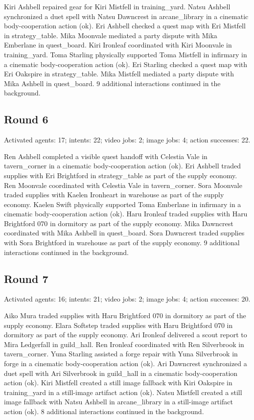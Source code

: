 \documentclass[11pt,a4paper]{article}
\begin{document}
Kiri Ashbell repaired gear for Kiri Mistfell in training\_yard. Natsu Ashbell synchronized a duet spell with Natsu Dawncrest in arcane\_library in a cinematic body-cooperation action (ok). Eri Ashbell checked a quest map with Eri Mistfell in strategy\_table. Mika Moonvale mediated a party dispute with Mika Emberlane in quest\_board. Kiri Ironleaf coordinated with Kiri Moonvale in training\_yard. Toma Starling physically supported Toma Mistfell in infirmary in a cinematic body-cooperation action (ok). Eri Starling checked a quest map with Eri Oakspire in strategy\_table. Mika Mistfell mediated a party dispute with Mika Ashbell in quest\_board. 9 additional interactions continued in the background.

\subsection{Round 6}
Activated agents: 17; intents: 22; video jobs: 2; image jobs: 4; action successes: 22.

Ren Ashbell completed a visible quest handoff with Celestia Vale in tavern\_corner in a cinematic body-cooperation action (ok). Eri Ashbell traded supplies with Eri Brightford in strategy\_table as part of the supply economy. Ren Moonvale coordinated with Celestia Vale in tavern\_corner. Sora Moonvale traded supplies with Kaelen Ironheart in warehouse as part of the supply economy. Kaelen Swift physically supported Toma Emberlane in infirmary in a cinematic body-cooperation action (ok). Haru Ironleaf traded supplies with Haru Brightford 070 in dormitory as part of the supply economy. Mika Dawncrest coordinated with Mika Ashbell in quest\_board. Sora Dawncrest traded supplies with Sora Brightford in warehouse as part of the supply economy. 9 additional interactions continued in the background.

\subsection{Round 7}
Activated agents: 16; intents: 21; video jobs: 2; image jobs: 4; action successes: 20.

Aiko Mura traded supplies with Haru Brightford 070 in dormitory as part of the supply economy. Elara Softstep traded supplies with Haru Brightford 070 in dormitory as part of the supply economy. Ari Ironleaf delivered a scout report to Mira Ledgerfall in guild\_hall. Ren Ironleaf coordinated with Ren Silverbrook in tavern\_corner. Yuna Starling assisted a forge repair with Yuna Silverbrook in forge in a cinematic body-cooperation action (ok). Ari Dawncrest synchronized a duet spell with Ari Silverbrook in guild\_hall in a cinematic body-cooperation action (ok). Kiri Mistfell created a still image fallback with Kiri Oakspire in training\_yard in a still-image artifact action (ok). Natsu Mistfell created a still image fallback with Natsu Ashbell in arcane\_library in a still-image artifact action (ok). 8 additional interactions continued in the background.
\end{document}
